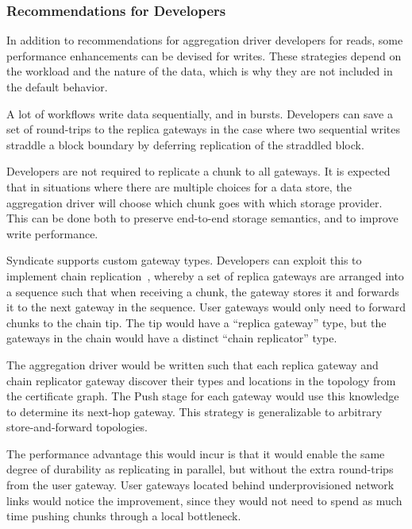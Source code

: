 
\subsubsection{Recommendations for Developers}

In addition to recommendations for aggregation driver developers for reads, some
performance enhancements can be devised for writes.  These strategies depend on
the workload and the nature of the data, which is why they are not included in
the default behavior.


A lot of workflows write data sequentially, and in bursts.
Developers can save a set of round-trips to the replica gateways
in the case where two sequential writes straddle a block boundary
by deferring replication of the straddled block.


Developers are not required to replicate a chunk to all gateways.  It is
expected that in situations where there are multiple choices for a data store,
the aggregation driver will choose which chunk goes with which storage provider.
This can be done both to preserve end-to-end storage semantics, and to improve
write performance.


Syndicate supports custom gateway types.  Developers can exploit this
to implement chain replication~\cite{craq}, whereby a set of 
replica gateways are arranged into a sequence such that when receiving a chunk,
the gateway stores it and forwards it to the next gateway in the sequence.
User gateways would only need to forward chunks to the chain tip.  The tip would
have a ``replica gateway'' type, but the gateways in the chain would have a
distinct ``chain replicator'' type.

The aggregation driver would be written
such that each replica gateway and chain replicator gateway discover their
types and locations in the topology from the certificate graph.  The Push stage
for each gateway would use this knowledge to determine its next-hop gateway.
This strategy is generalizable to arbitrary store-and-forward topologies.

The performance advantage this would incur is that it would enable the same
degree of durability as replicating in parallel, but without the extra
round-trips from the user gateway.  User gateways located behind
underprovisioned network links would notice the improvement, since they would
not need to spend as much time pushing chunks through a local bottleneck.

